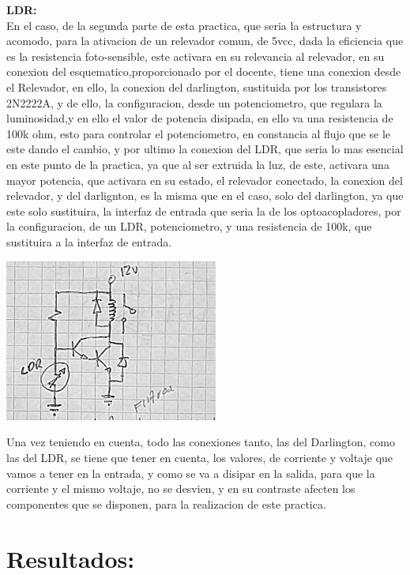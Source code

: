 \documentclass[12pt,a4paper]{article}
\begin{document}
\textbf{LDR:}\\

En el caso, de la segunda parte de esta practica, que seria la estructura y acomodo, para la ativacion de un relevador comun, de 5vcc, dada la eficiencia que es la resistencia foto-sensible, este activara en su relevancia al relevador, en su conexion del esquematico,proporcionado por el docente, tiene una conexion desde el Relevador, en ello, la conexion del darlington, sustituida por los transistores 2N2222A, y de ello, la configuracion, desde un potenciometro, que regulara la luminosidad,y en ello el valor de potencia disipada, en ello va una resistencia de 100k ohm, esto para controlar el potenciometro, en constancia al flujo que se le este dando el cambio, y por ultimo la conexion del LDR, que seria lo mas esencial en este punto de la practica, ya que al ser extruida la luz, de este, activara una mayor potencia, que activara en su estado, el relevador conectado, la conexion del relevador, y del darlignton, es la misma que en el caso, solo del darlington, ya que este solo sustituira, la interfaz de entrada que seria la de los optoacopladores, por la configuracion, de un LDR, potenciometro, y una resistencia de 100k, que sustituira a la interfaz de entrada.\\

\begin{center}
\includegraphics[width=7cm]{esquema2.jpeg} 
\end{center}

Una vez teniendo en cuenta, todo las conexiones tanto, las del Darlington, como las del LDR, se tiene que tener en cuenta, los valores, de corriente y voltaje que vamos a tener en la entrada, y como se va a disipar en la salida, para que la corriente y el mismo voltaje, no se desvien, y  en su contraste afecten los componentes que se disponen, para la realizacion de este practica. 

\section{Resultados:}
\end{document}
